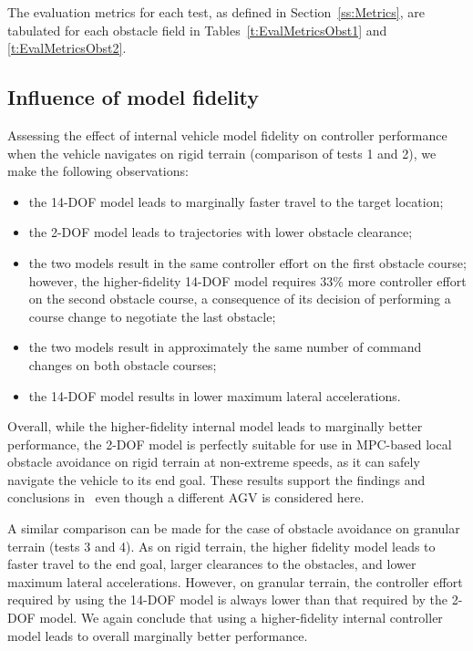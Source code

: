 \documentclass[12pt,onecolumn]{article}
\begin{document}
The evaluation metrics for each test, as defined in Section~\ref{ss:Metrics}, are tabulated for each obstacle field in Tables~\ref{t:EvalMetricsObst1} and \ref{t:EvalMetricsObst2}. 

\subsection{Influence of model fidelity}

Assessing the effect of internal vehicle model fidelity on controller performance when the vehicle navigates on rigid terrain (comparison of tests 1 and 2), we make the following observations:
\begin{itemize}
\item the 14-DOF model leads to marginally faster travel to the target location;
\item the 2-DOF model leads to trajectories with lower obstacle clearance;
\item the two models result in the same controller effort on the first obstacle course; however, the higher-fidelity 14-DOF model requires 33\% more controller effort on the second obstacle course, a consequence of its decision of performing a course change to negotiate the last obstacle;
\item the two models result in approximately the same number of command changes on both obstacle courses;
\item the 14-DOF model results in lower maximum lateral accelerations.
\end{itemize}


Overall, while the higher-fidelity internal model leads to marginally better performance, the 2-DOF model is perfectly suitable for use in MPC-based local obstacle avoidance on rigid terrain at non-extreme speeds, as it can safely navigate the vehicle to its end goal. These results support the findings and conclusions in~\cite{ModelFidelity2016} even though a different AGV is considered here.

A similar comparison can be made for the case of obstacle avoidance on granular terrain (tests 3 and 4).  As on rigid terrain, the higher fidelity model leads to faster travel to the end goal, larger clearances to the obstacles, and lower maximum lateral accelerations.  However, on granular terrain, the controller effort required by using the 14-DOF model is always lower than that required by the 2-DOF model.  We again conclude that using a higher-fidelity internal controller model leads to overall marginally better performance.
\end{document}
